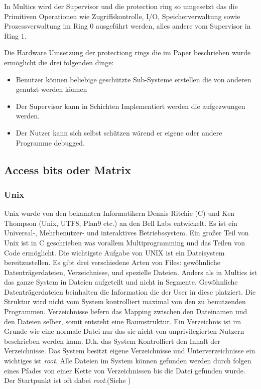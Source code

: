 \documentclass[9pt,technote]{IEEEtran}
\begin{document}
    In Multics wird der Supervisor und die protection ring so umgesetzt das die Primitiven Operationen wie Zugriffskontrolle, I/O, Speicherverwaltung sowie
    Prozessverwaltung im Ring 0 ausgef\"uhrt werden, alles andere vom Supervisor in Ring 1.
    
    Die Hardware Umsetzung der protectiong rings die im Paper \cite{inproc:protec-rings} beschrieben wurde erm\"oglicht die drei folgenden dinge:
    \begin{itemize}
      \item Benutzer k\"onnen beliebige gesch\"utzte Sub-Systeme erstellen die von anderen genutzt werden k\"onnen
      \item Der Supervisor kann in Schichten Implementiert werden die aufgezwungen werden.
      \item Der Nutzer kann sich selbst sch\"utzen w\"arend er eigene oder andere Programme debugged.
    \end{itemize}
    
    \subsection{Access bits oder Matrix}
      \subsubsection{Unix}
		    Unix wurde von den bekannten Informatikern Dennis Ritchie (C) und Ken Thompson (Unix, UTF8, Plan9 etc.) an den Bell Labs entwickelt.
		    Es ist ein Universal-, Mehrbenutzer- und interaktives Betriebssystem. Ein gro\ss er Teil von Unix ist in C geschrieben was vorallem Multiprogramming
		    und das Teilen von Code erm\"oglicht. Die wichtigste Aufgabe von UNIX ist ein Dateisystem bereitzustellen. Es gibt drei verschiedene Arten von Files:
		    gew\"ohnliche Datentr\"agerdateien, Verzeichnisse, und spezielle Dateien. Anders als in Multics ist das ganze System in Dateien aufgeteilt und nicht in
		    Segmente. Gew\"ohnliche Datentr\"agerdateien beinhalten die Information die der User in diese platziert. 
		    Die Struktur wird nicht vom System kontrolliert maximal
		    von den zu benutzenden Programmen. Verzeichnisse liefern das Mapping zwischen den Dateinamen und den Dateien selber, somit entsteht eine Baumstruktur.
		    Ein Verzeichnis ist im Grunde wie eine normale Datei nur das sie nicht von unprivilegierten Nutzern beschrieben werden kann. D.h. das System Kontrolliert den
		    Inhalt der Verzeichnisse. Das System besitzt eigene Verzeichnisse und Unterverzeichnisse ein wichtiges ist \textit{root}.
		     Alle Dateien im System k\"onnen gefunden 
		    werden durch folgen eines Pfades von einer Kette von Verzeichnissen bis die Datei gefunden wurde. 
		    Der Startpunkt ist oft dabei \textit{root}.(Siehe \cite[S. 366]{inproc:unix})
		    
\end{document}
